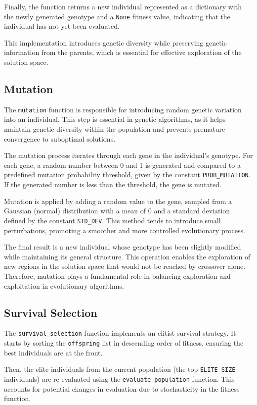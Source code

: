 \documentclass{article}
\begin{document}
Finally, the function returns a new individual represented as a dictionary with the newly generated genotype and a \texttt{None} fitness value, indicating that the individual has not yet been evaluated.

This implementation introduces genetic diversity while preserving genetic information from the parents, which is essential for effective exploration of the solution space.

\subsection{Mutation}
The \texttt{mutation} function is responsible for introducing random genetic variation into an individual. This step is essential in genetic algorithms, as it helps maintain genetic diversity within the population and prevents premature convergence to suboptimal solutions.

The mutation process iterates through each gene in the individual's genotype. For each gene, a random number between 0 and 1 is generated and compared to a predefined mutation probability threshold, given by the constant \texttt{PROB\_MUTATION}. If the generated number is less than the threshold, the gene is mutated.

Mutation is applied by adding a random value to the gene, sampled from a Gaussian (normal) distribution with a mean of 0 and a standard deviation defined by the constant \texttt{STD\_DEV}. This method tends to introduce small perturbations, promoting a smoother and more controlled evolutionary process.

The final result is a new individual whose genotype has been slightly modified while maintaining its general structure. This operation enables the exploration of new regions in the solution space that would not be reached by crossover alone. Therefore, mutation plays a fundamental role in balancing exploration and exploitation in evolutionary algorithms.
\subsection{Survival Selection}
The \texttt{survival\_selection} function implements an elitist survival strategy. It starts by sorting the \texttt{offspring} list in descending order of fitness, ensuring the best individuals are at the front.

Then, the elite individuals from the current population (the top \texttt{ELITE\_SIZE} individuals) are re-evaluated using the \texttt{evaluate\_population} function. This accounts for potential changes in evaluation due to stochasticity in the fitness function.
\end{document}
